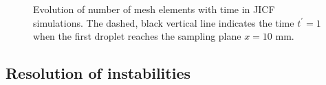 \begin{figure}[ht]
%
   \caption{Evolution of number of mesh elements with time in JICF simulations. The dashed, black vertical line indicates the time $t^\prime = 1$ when the first droplet reaches the sampling plane $x = 10$ mm.}
\label{fig:JICF_nelem_increase}
\end{figure}


\subsection{Resolution of instabilities}
\label{subsec:ch5_instabilities_presence}

